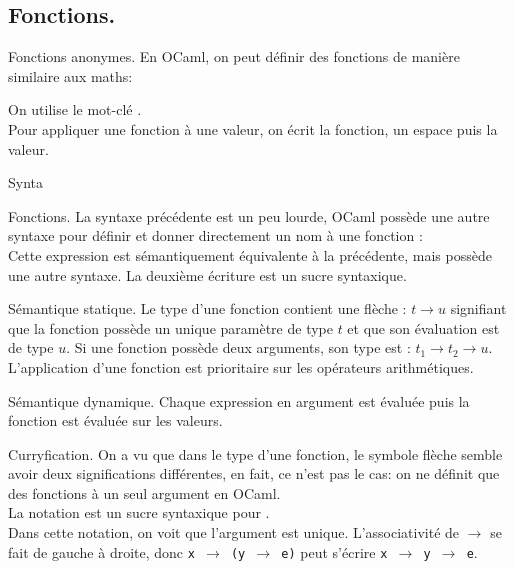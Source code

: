 \documentclass[french, 11pt]{article}
\begin{document}
\subsection{Fonctions.}

\begin{defi}{Fonctions anonymes.}{}
    En OCaml, on peut définir des fonctions de manière similaire aux maths:
    \begin{center}
    \end{center}
    On utilise le mot-clé .\\
    Pour appliquer une fonction à une valeur, on écrit la fonction, un espace puis la valeur.
\end{defi}
Synta
\begin{defi}{Fonctions.}{}
    La syntaxe précédente est un peu lourde, OCaml possède une autre syntaxe pour définir et donner directement un nom à une fonction : \\
    Cette expression est sémantiquement équivalente à la précédente, mais possède une autre syntaxe. La deuxième écriture est un sucre syntaxique.
\end{defi}

\begin{defi}{Sémantique statique.}{}
    Le type d'une fonction contient une flèche : $t \to u$ signifiant que la fonction possède un unique paramètre de type $t$ et que son évaluation est de type $u$.\n
    Si une fonction possède deux arguments, son type est : $t_1\to t_2 \to u$.\\
    L'application d'une fonction est prioritaire sur les opérateurs arithmétiques.
\end{defi}

\begin{defi}{Sémantique dynamique.}{}
    Chaque expression en argument est évaluée puis la fonction est évaluée sur les valeurs.
\end{defi}

\begin{defi}{Curryfication.}{}
    On a vu que dans le type d'une fonction, le symbole flèche semble avoir deux significations différentes, en fait, ce n'est pas le cas: on ne définit que des fonctions à un seul argument en OCaml.\\
    La notation  est un sucre syntaxique pour .\\
    Dans cette notation, on voit que l'argument est unique.\n
    L'associativité de $\to$ se fait de gauche à droite, donc \texttt{x $\to$ (y $\to$ e)} peut s'écrire \texttt{x $\to$ y $\to$ e}.
\end{defi}
\end{document}
